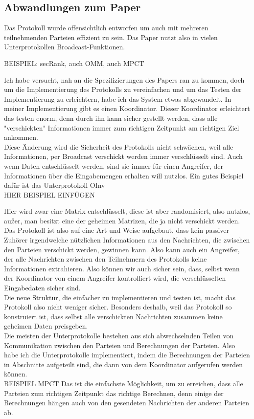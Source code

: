 \documentclass[a4paper,10pt]{scrartcl}
\begin{document}
\subsection{Abwandlungen zum Paper}
Das Protokoll wurde offensichtlich entworfen um auch mit mehreren teilnehmenden Parteien effizient zu sein.
Das Paper \cite{Doettling2021} nutzt also in vielen Unterprotokollen Broadcast-Funktionen.

BEISPIEL: secRank, auch OMM, auch MPCT

Ich habe versucht, nah an die Spezifizierungen des Papers ran zu kommen, doch 
um die Implementierung des Protokolls zu vereinfachen und um das Testen der Implementierung zu erleichtern, habe ich das System etwas abgewandelt. In meiner Implementierung gibt es einen Koordinator. Dieser Koordinator erleichtert das testen enorm, denn durch ihn kann sicher gestellt werden, dass alle "verschickten" Informationen immer zum richtigen Zeitpunkt am richtigen Ziel ankommen.\\
Diese Änderung wird die Sicherheit des Protokolls nicht schwächen, weil alle Informationen, per Broadcast verschickt werden immer verschlüsselt sind.
Auch wenn Daten entschlüsselt werden, sind sie immer für einen Angreifer, der Informationen über die Eingabemengen erhalten will nutzlos. Ein gutes Beispiel dafür ist das Unterprotokoll OInv \\
HIER BEISPIEL EINFÜGEN

Hier wird zwar eine Matrix entschlüsselt, diese ist aber randomisiert, also nutzlos, außer, man besitzt eine der geheimen Matrizen, die ja nicht verschickt werden.\\
Das Protokoll ist also auf eine Art und Weise aufgebaut, dass kein passiver Zuhörer irgendwelche nützlichen Informationen aus den Nachrichten, die zwischen den Parteien verschickt werden, gewinnen kann. Also kann auch ein Angreifer, der alle Nachrichten zwischen den Teilnehmern des Protokolls keine Informationen extrahieren. Also können wir auch sicher sein, dass, selbst wenn der Koordinator von einem Angreifer kontrolliert wird, die verschlüsselten Eingabedaten sicher sind.\\
Die neue Struktur, die einfacher zu implementieren und testen ist, macht das Protokoll also nicht weniger sicher. Besonders deshalb, weil das Protokoll so konstruiert ist, dass selbst alle verschickten Nachrichten zusammen keine geheimen Daten preisgeben.\\

Die meisten der Unterprotokolle bestehen aus sich abwechselnden Teilen von Kommunikation zwischen den Parteien und Berechnungen der Parteien. Also habe ich die Unterprotokolle implementiert, indem die Berechnungen der Parteien in Abschnitte aufgeteilt sind, die dann von dem Koordinator aufgerufen werden können.\\
BEISPIEL MPCT
Das ist die einfachste Möglichkeit, um zu erreichen, dass alle Parteien zum richtigen Zeitpunkt das richtige Berechnen, denn einige der Berechnungen hängen auch von den gesendeten Nachrichten der anderen Parteien ab.\\
\end{document}
